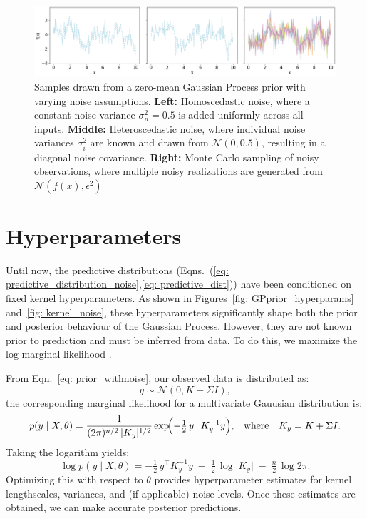 \documentclass{ucdgradtaughtthesis}
\begin{document}
\begin{figure}[H]
    \centering
    \includegraphics[width=\textwidth]{LatexPlots/1dplots/GPR_noise_comparison.png}
    \caption[Comparing samples taken from a GP with Homoscedastic noise,Heteroscedastic noise and Monte Carlo sampling of the noise.]{Samples drawn from a zero-mean Gaussian Process prior with varying noise assumptions.
    \textbf{Left:} Homoscedastic noise, where a constant noise variance \(\sigma_n^2 = 0.5\) is added uniformly across all inputs.
    \textbf{Middle:} Heteroscedastic noise, where individual noise variances \(\sigma_i^2\) are known and drawn from \(\mathcal{N}(0, 0.5)\), resulting in a diagonal noise covariance.
    \textbf{Right:} Monte Carlo sampling of noisy observations, where multiple noisy realizations are generated from \(\mathcal{N}(f(x), \epsilon^2)\)}
    \label{fig:noise_comparison}
\end{figure}




\section{Hyperparameters}
\label{sec: Hyper_parameters}
Until now, the predictive distributions (Eqns.~(\eqref{eq: predictive_distribution_noise},\eqref{eq: predictive_dist})) have been conditioned on fixed kernel hyperparameters. 
As shown in Figures~\ref{fig: GPprior_hyperparams} and~\ref{fig: kernel_noise}, 
these hyperparameters significantly shape both the prior and posterior behaviour of the Gaussian Process.
 However, they are not known prior to prediction and must be inferred from data. To do this, we maximize the log marginal likelihood \cite[Ch.~5]{bible}.

From Eqn.~\eqref{eq: prior_withnoise}, our observed data is distributed as: 
\[
y \sim \mathcal{N}(0, K + \Sigma I),
\]
the corresponding marginal likelihood for a multivariate Gauusian distribution is:
\begin{equation}
p(y \mid X, \theta) = \frac{1}{(2\pi)^{n/2} \,\lvert K_y \rvert^{1/2}} 
\exp\!\Bigl(-\tfrac12\,y^\top K_y^{-1} y\Bigr), 
\quad\!\text{where}\quad K_y = K + \Sigma I.
\end{equation}
Taking the logarithm yields:
\begin{equation}\label{eq: 5}
\log p(y \mid X, \theta) 
= -\tfrac{1}{2}\,y^\top K_y^{-1}y \;-\; \tfrac{1}{2}\,\log\lvert K_y \rvert \;-\; \tfrac{n}{2}\,\log 2\pi.
\end{equation}
Optimizing this with respect to \(\theta\) provides hyperparameter estimates for kernel lengthscales, 
variances, and (if applicable) noise levels. Once these estimates are obtained, we can make accurate posterior predictions.
\end{document}
